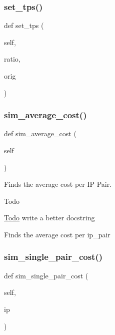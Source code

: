 \subsubsection{\texorpdfstring{set\_tps()}{set\_tps()}}
{\footnotesize\ttfamily def set\+\_\+tps (\begin{DoxyParamCaption}\item[{}]{self,  }\item[{}]{ratio,  }\item[{}]{orig }\end{DoxyParamCaption})}

\mbox{\label{classdynamicfilterapp_1_1test__simulations_1_1_simulation_test_ae3108f4ec1a39e163c4fc07f11b63c15}} 
\subsubsection{\texorpdfstring{sim\_average\_cost()}{sim\_average\_cost()}}
{\footnotesize\ttfamily def sim\+\_\+average\+\_\+cost (\begin{DoxyParamCaption}\item[{}]{self }\end{DoxyParamCaption})}



Finds the average cost per IP Pair. 

\begin{DoxyRefDesc}{Todo}
\item[\mbox{\hyperlink{todo__todo000003}{Todo}}]write a better docstring \end{DoxyRefDesc}
\begin{DoxyVerb}Finds the average cost per ip_pair
\end{DoxyVerb}
 \mbox{\label{classdynamicfilterapp_1_1test__simulations_1_1_simulation_test_abf3ff009ae041f4856e34b301c551224}} 
\subsubsection{\texorpdfstring{sim\_single\_pair\_cost()}{sim\_single\_pair\_cost()}}
{\footnotesize\ttfamily def sim\+\_\+single\+\_\+pair\+\_\+cost (\begin{DoxyParamCaption}\item[{}]{self,  }\item[{}]{ip }\end{DoxyParamCaption})}




